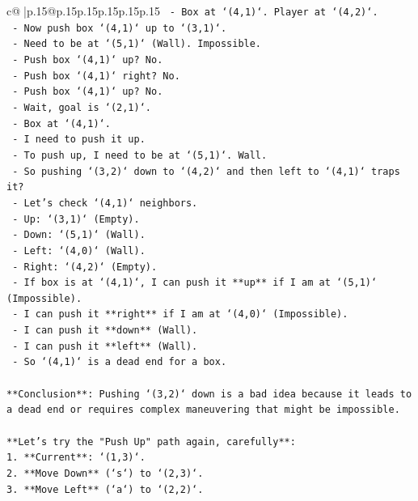 \documentclass{article}
\begin{document}
{\begin{supertabular}{c@{$\;$}|p{.15\linewidth}@{}p{.15\linewidth}p{.15\linewidth}p{.15\linewidth}p{.15\linewidth}p{.15\linewidth}}
{{{\texttt{       {-} Box at `(4,1)`. Player at `(4,2)`.} \\
\texttt{   {-} Now push box `(4,1)` up to `(3,1)`.} \\
\texttt{     {-} Need to be at `(5,1)` (Wall). Impossible.} \\
\texttt{   {-} Push box `(4,1)` up? No.} \\
\texttt{   {-} Push box `(4,1)` right? No.} \\
\texttt{   {-} Push box `(4,1)` up? No.} \\
\texttt{   {-} Wait, goal is `(2,1)`.} \\
\texttt{   {-} Box at `(4,1)`.} \\
\texttt{   {-} I need to push it up.} \\
\texttt{   {-} To push up, I need to be at `(5,1)`. Wall.} \\
\texttt{   {-} So pushing `(3,2)` down to `(4,2)` and then left to `(4,1)` traps it?} \\
\texttt{   {-} Let's check `(4,1)` neighbors.} \\
\texttt{     {-} Up: `(3,1)` (Empty).} \\
\texttt{     {-} Down: `(5,1)` (Wall).} \\
\texttt{     {-} Left: `(4,0)` (Wall).} \\
\texttt{     {-} Right: `(4,2)` (Empty).} \\
\texttt{   {-} If box is at `(4,1)`, I can push it **up** if I am at `(5,1)` (Impossible).} \\
\texttt{   {-} I can push it **right** if I am at `(4,0)` (Impossible).} \\
\texttt{   {-} I can push it **down** (Wall).} \\
\texttt{   {-} I can push it **left** (Wall).} \\
\texttt{   {-} So `(4,1)` is a dead end for a box.} \\
\\ 
\texttt{**Conclusion**: Pushing `(3,2)` down is a bad idea because it leads to a dead end or requires complex maneuvering that might be impossible.} \\
\\ 
\texttt{**Let's try the "Push Up" path again, carefully**:} \\
\texttt{1. **Current**: `(1,3)`.} \\
\texttt{2. **Move Down** (`s`) to `(2,3)`.} \\
\texttt{3. **Move Left** (`a`) to `(2,2)`.} \\
}}}
\end{supertabular}}
\end{document}
